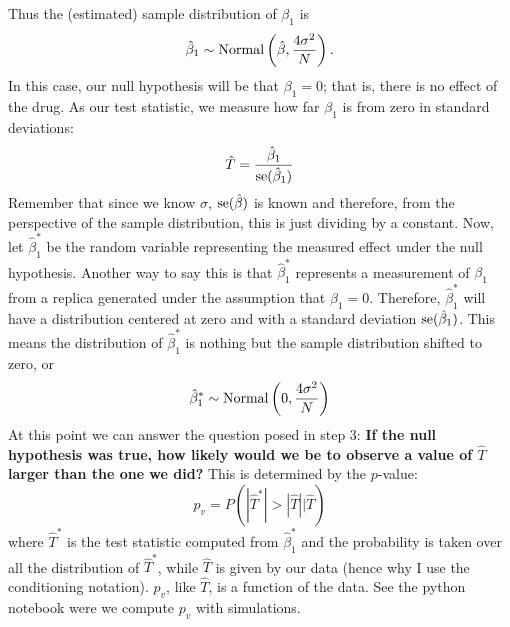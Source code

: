 \begin{example}
Thus the (estimated) sample distribution of $\beta_1$ is 
\begin{equation*}
\hat{\beta}_1 \sim {\rm Normal}\left(\hat{\beta},\frac{4\sigma^2}{N}\right). 
\end{equation*}
In this case, our null hypothesis will be that $\beta_1  = 0$; that is, there is no effect of the drug. As our test statistic, we measure how far $\beta_1$ is from zero in standard deviations: 
\begin{equation*}
\hat{T} = \frac{\hat{\beta}_1}{{\rm se}(\hat{\beta}_1 )}
\end{equation*}
Remember that since we know $\sigma$,  ${\rm se}(\hat{\beta})$ is known and therefore, from the perspective of the sample distribution, this is just dividing by a constant. 
Now, let $\hat{\beta}_1^*$ be the random variable representing the measured effect under the null hypothesis. Another way to say this is that $\hat{\beta}_1^*$ represents a measurement of $\beta_1$ from a replica generated under the assumption that $\beta_1=0$. Therefore, $\hat{\beta}_1^*$ will have a distribution centered at zero and with a standard deviation ${\rm se}(\hat{\beta}_1)$. This means the distribution of $\hat{\beta}_1^*$ is nothing but the sample distribution shifted to zero, or 
\begin{equation*}
\hat{\beta}_1^* \sim {\rm Normal}\left(0,\frac{4\sigma^2}{N}\right)
\end{equation*}
 At this point we can answer the question posed in step 3: {\bf If the null hypothesis was true, how likely would we be to observe a value of $\hat{T}$ larger than the one we did?} This is determined by the $p$-value:
\begin{equation}\label{eq:pval}
p_v = P(|\hat{T}^*|>|\hat{T}||\hat{T})
\end{equation}
where $\hat{T}^*$ is the test statistic computed from $\hat{\beta}_1^*$ and the probability is taken over all the distribution of $\hat{T}^*$, while $\hat{T}$ is given by our data (hence why I use the conditioning notation). $p_v$, like $\hat{T}$, is a function of the data. See the python notebook were we compute $p_v$ with simulations. 

\end{example}


